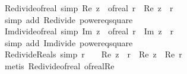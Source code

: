 \begin{isabellebody}
\isanewline
{}\isamarkupfalse%
\ Re{\isacharunderscore}{\kern0pt}divide{\isacharunderscore}{\kern0pt}of{\isacharunderscore}{\kern0pt}real\ {\isacharbrackleft}{\kern0pt}simp{\isacharbrackright}{\kern0pt}{\isacharcolon}{\kern0pt}\ {\isachardoublequoteopen}Re\ {\isacharparenleft}{\kern0pt}z\ {\isacharslash}{\kern0pt}\ of{\isacharunderscore}{\kern0pt}real\ r{\isacharparenright}{\kern0pt}\ {\isacharequal}{\kern0pt}\ Re\ z\ {\isacharslash}{\kern0pt}\ r{\isachardoublequoteclose}\isanewline
%
\isadelimproof
\ \ %
\endisadelimproof
%
\isatagproof
{}\isamarkupfalse%
\ {\isacharparenleft}{\kern0pt}simp\ add{\isacharcolon}{\kern0pt}\ Re{\isacharunderscore}{\kern0pt}divide\ power{}{\isacharunderscore}{\kern0pt}eq{\isacharunderscore}{\kern0pt}square{\isacharparenright}{\kern0pt}%
\endisatagproof
{\isafoldproof}%
%
\isadelimproof
\isanewline
%
\endisadelimproof
\isanewline
{}\isamarkupfalse%
\ Im{\isacharunderscore}{\kern0pt}divide{\isacharunderscore}{\kern0pt}of{\isacharunderscore}{\kern0pt}real\ {\isacharbrackleft}{\kern0pt}simp{\isacharbrackright}{\kern0pt}{\isacharcolon}{\kern0pt}\ {\isachardoublequoteopen}Im\ {\isacharparenleft}{\kern0pt}z\ {\isacharslash}{\kern0pt}\ of{\isacharunderscore}{\kern0pt}real\ r{\isacharparenright}{\kern0pt}\ {\isacharequal}{\kern0pt}\ Im\ z\ {\isacharslash}{\kern0pt}\ r{\isachardoublequoteclose}\isanewline
%
\isadelimproof
\ \ %
\endisadelimproof
%
\isatagproof
{}\isamarkupfalse%
\ {\isacharparenleft}{\kern0pt}simp\ add{\isacharcolon}{\kern0pt}\ Im{\isacharunderscore}{\kern0pt}divide\ power{}{\isacharunderscore}{\kern0pt}eq{\isacharunderscore}{\kern0pt}square{\isacharparenright}{\kern0pt}%
\endisatagproof
{\isafoldproof}%
%
\isadelimproof
\isanewline
%
\endisadelimproof
\isanewline
{}\isamarkupfalse%
\ Re{\isacharunderscore}{\kern0pt}divide{\isacharunderscore}{\kern0pt}Reals\ {\isacharbrackleft}{\kern0pt}simp{\isacharbrackright}{\kern0pt}{\isacharcolon}{\kern0pt}\ {\isachardoublequoteopen}r\ {\isasymin}\ {\isasymreal}\ {\isasymLongrightarrow}\ Re\ {\isacharparenleft}{\kern0pt}z\ {\isacharslash}{\kern0pt}\ r{\isacharparenright}{\kern0pt}\ {\isacharequal}{\kern0pt}\ Re\ z\ {\isacharslash}{\kern0pt}\ Re\ r{\isachardoublequoteclose}\isanewline
%
\isadelimproof
\ \ %
\endisadelimproof
%
\isatagproof
{}\isamarkupfalse%
\ {\isacharparenleft}{\kern0pt}metis\ Re{\isacharunderscore}{\kern0pt}divide{\isacharunderscore}{\kern0pt}of{\isacharunderscore}{\kern0pt}real\ of{\isacharunderscore}{\kern0pt}real{\isacharunderscore}{\kern0pt}Re{\isacharparenright}{\kern0pt}%

\end{isabellebody}
